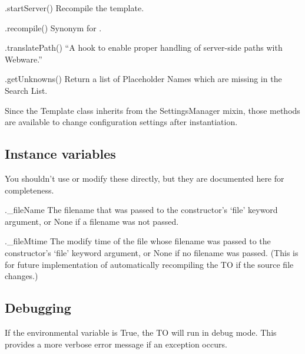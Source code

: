 \begin{description}
\item{.startServer()}  Recompile the template.  

\item{.recompile()}  Synonym for .

\item{.translatePath()}  ``A hook to enable proper handling of server-side
     paths with Webware.''
     
\item{.getUnknowns()}  Return a list of Placeholder Names which are missing in
     the Search List.

\end{description}

Since the Template class inherits from the SettingsManager mixin, those methods
are available to change configuration settings after instantiation.




\subsection{Instance variables}

You shouldn't use or modify these directly, but they are documented here for
completeness.

\begin{description}

\item{._fileName}  The filename that was passed to the constructor's `file'
     keyword argument, or None if a filename was not passed.
     
\item{._fileMtime}  The modify time of the file whose filename was passed to
     the constructor's `file' keyword argument, or None if no filename was
     passed.  (This is for future implementation of automatically recompiling
     the TO if the source file changes.)

\end{description}


\subsection{Debugging}

If the environmental variable  is True, the TO will
run in debug mode.  This provides a more verbose error message if an 
exception occurs.


